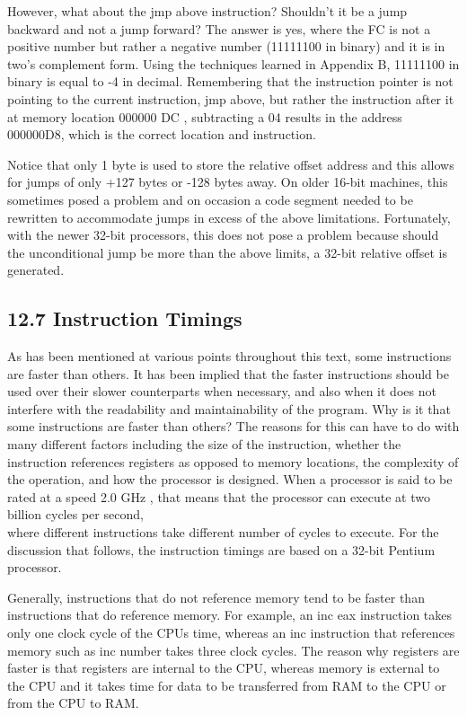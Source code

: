 \documentclass[10pt]{book}
\begin{document}
However, what about the jmp above instruction? Shouldn't it be a jump backward and not a jump forward? The answer is yes, where the FC is not a positive number but rather a negative number (11111100 in binary) and it is in two's complement form. Using the techniques learned in Appendix B, 11111100 in binary is equal to -4 in decimal. Remembering that the instruction pointer is not pointing to the current instruction, jmp above, but rather the instruction after it at memory location 000000 DC , subtracting a 04 results in the address 000000D8, which is the correct location and instruction.

Notice that only 1 byte is used to store the relative offset address and this allows for jumps of only +127 bytes or -128 bytes away. On older 16-bit machines, this sometimes posed a problem and on occasion a code segment needed to be rewritten to accommodate jumps in excess of the above limitations. Fortunately, with the newer 32-bit processors, this does not pose a problem because should the unconditional jump be more than the above limits, a 32-bit relative offset is generated.

\subsection*{12.7 Instruction Timings}
As has been mentioned at various points throughout this text, some instructions are faster than others. It has been implied that the faster instructions should be used over their slower counterparts when necessary, and also when it does not interfere with the readability and maintainability of the program. Why is it that some instructions are faster than others? The reasons for this can have to do with many different factors including the size of the instruction, whether the instruction references registers as opposed to memory locations, the complexity of the operation, and how the processor is designed. When a processor is said to be rated at a speed 2.0 GHz , that means that the processor can execute at two billion cycles per second,\\
where different instructions take different number of cycles to execute. For the discussion that follows, the instruction timings are based on a 32-bit Pentium processor.


Generally, instructions that do not reference memory tend to be faster than instructions that do reference memory. For example, an inc eax instruction takes only one clock cycle of the CPUs time, whereas an inc instruction that references memory such as inc number takes three clock cycles. The reason why registers are faster is that registers are internal to the CPU, whereas memory is external to the CPU and it takes time for data to be transferred from RAM to the CPU or from the CPU to RAM.
\end{document}
